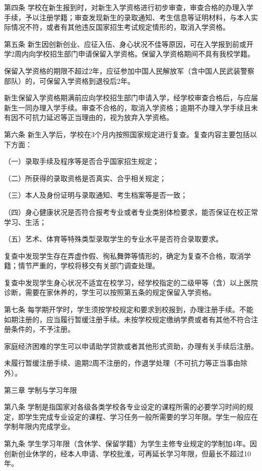 \documentclass[UTF8,12pt,a4paper]{report}
\begin{document}
第四条  学校在新生报到时，对新生入学资格进行初步审查，审查合格的办理入学手续，予以注册学籍；审查发现新生的录取通知、考生信息等证明材料，与本人实际情况不符，或者有其他违反国家招生考试规定情形的，取消入学资格。

第五条  新生因创新创业、应征入伍、身心状况不佳等原因，可在入学报到前或开学2周内向学校招生部门申请保留入学资格。保留入学资格期间不具有我校学籍。

保留入学资格的期限不超过2年，应征参加中国人民解放军（含中国人民武装警察部队）的，可保留入学资格到退役后2年。

新生保留入学资格期满前应向学校招生部门申请入学，经学校审查合格后，与应届新生一同办理入学手续。审查不合格的，取消入学资格；逾期不办理入学手续且未有因不可抗力延迟等正当理由的，视为放弃入学资格。

第六条  新生入学后，学校在3个月内按照国家规定进行复查。复查内容主要包括以下方面：

（一）录取手续及程序等是否合乎国家招生规定；

（二）所获得的录取资格是否真实、合乎相关规定；

（三）本人及身份证明与录取通知、考生档案等是否一致；

（四）身心健康状况是否符合报考专业或者专业类别体检要求，能否保证在校正常学习、生活；

（五）艺术、体育等特殊类型录取学生的专业水平是否符合录取要求。

复查中发现学生存在弄虚作假、徇私舞弊等情形的，确定为复查不合格，取消学籍；情节严重的，学校将移交有关部门调查处理。

复查中发现学生身心状况不适宜在校学习，经学校指定的二级甲等（含）以上医院诊断，需要在家休养的，学生可以按照第五条的规定保留入学资格。

第七条  每学期开学时，学生须按学校规定和要求到校报到，办理注册手续。不能如期注册的，应当履行暂缓注册手续。未按学校规定缴纳学费或者有其他不符合注册条件的，不予注册。

家庭经济困难的学生可以申请助学贷款或者其他形式资助，办理有关手续后注册。

未履行暂缓注册手续、逾期2周不注册的，作退学处理（不可抗力等正当事由除外）。



第三章  学制与学习年限

第八条  学制是指国家对各级各类学校各专业设定的课程所需的必要学习时间的规定，即学生完成专业设定的课程、学习任务一般所需要的学习年限。学生一般应在学制年限内完成学业。

第九条  学生学习年限（含休学、保留学籍）为学生主修专业规定的学制加4年。因创新创业休学的，经本人申请、学校批淮，可再延长学习年限，但最长不超过10年。　　
\end{document}
